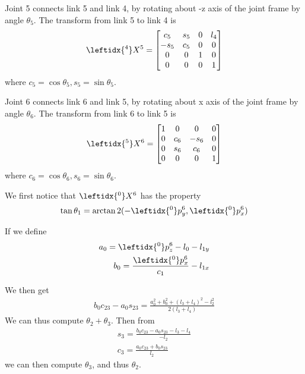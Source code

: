 \documentclass{article}
\begin{document}
Joint 5 connects link 5 and link 4, by rotating about -z axis of the joint frame by angle $\theta_5$. The transform from link 5 to link 4 is
\begin{align}
	\leftidx{^4}X^5 = \begin{bmatrix}
		c_5 & s_5 & 0 & l_4\\
		-s_5 & c_5 & 0 & 0\\
		0 & 0 & 1 & 0\\
		0 & 0 & 0 & 1
	\end{bmatrix}
\end{align}
where $c_5=\cos\theta_5,s_5=\sin\theta_5$.

Joint 6 connects link 6 and link 5, by rotating about x axis of the joint frame by angle $\theta_6$. The transform from link 6 to link 5 is
\begin{align}
	\leftidx{^5}X^6 = \begin{bmatrix}
		1 & 0 & 0 & 0\\
		0 & c_6 & -s_6 & 0\\
		0 & s_6 & c_6 & 0\\
		0 & 0 & 0 & 1
	\end{bmatrix}
\end{align}
where $c_6=\cos\theta_6, s_6=\sin\theta_6$.

We first notice that $\leftidx{^0}X^6$ has the property
\begin{align}
	\tan\theta_1 = \arctan2(-\leftidx{^0}p^6_y, \leftidx{^0}p^6_x)
\end{align}

If we define
\begin{align}
	a_0 = \leftidx{^0}p^6_z - l_0 - l_{1y}\\
	b_0 = \frac{\leftidx{^0}p^6_x}{c_1}-l_{1x}
\end{align}

We then get 
\begin{align}
	b_0c_{23}-a_0s_{23} = \frac{a_0^2 + b_0^2 + (l_3 + l_4)^2 - l_2^2}{2(l_3 + l_4)}
\end{align}
We can thus compute $\theta_2 + \theta_3$. Then from
\begin{align}
	s_3 = \frac{b_0c_{23}-a_0s_{23}-l_3 - l_4}{-l_2}\\
	c_3 = \frac{a_0c_{23} + b_0s_{23}}{l_2}
\end{align}
we can then compute $\theta_3$, and thus $\theta_2$.
\end{document}
